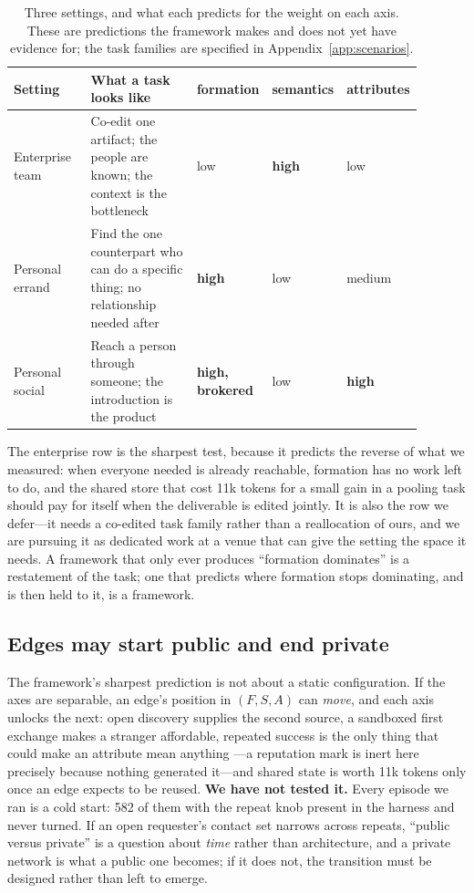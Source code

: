 \ifcompact\else
\begin{table}[t]
\centering\small
\caption{Three settings, and what each predicts for the weight on each axis. These are
predictions the framework makes and does not yet have evidence for; the task families
are specified in Appendix~\ref{app:scenarios}.}
\label{tab:scenarios}
\begin{tabular}{@{}p{0.20\linewidth}p{0.30\linewidth}p{0.13\linewidth}p{0.13\linewidth}p{0.13\linewidth}@{}}
\toprule
\textbf{Setting} & \textbf{What a task looks like} & \textbf{formation} & \textbf{semantics} & \textbf{attributes} \\
\midrule
Enterprise team & Co-edit one artifact; the people are known; the context is the
  bottleneck & low & \textbf{high} & low \\
\addlinespace[2pt]
Personal errand & Find the one counterpart who can do a specific thing; no
  relationship needed after & \textbf{high} & low & medium \\
\addlinespace[2pt]
Personal social & Reach a person through someone; the introduction is the product &
  \textbf{high, brokered} & low & \textbf{high} \\
\bottomrule
\end{tabular}
\end{table}
\fi


The enterprise row is the sharpest test, because it predicts the reverse of what we
measured: when everyone needed is already reachable, formation has no work left to do, and
the shared store that cost 11k tokens for a small gain in a pooling task should pay for
itself when the deliverable is edited jointly. It is also the row we defer---it needs a
co-edited task family rather than a reallocation of ours, and we are pursuing it as
dedicated work at a venue that can give the setting the space it needs. A framework that only ever produces
``formation dominates'' is a restatement of the task; one that predicts where formation
stops dominating, and is then held to it, is a framework.

\ifcompact
\subsection{Edges may start public and end private}
\label{sec:lifecycle}

The framework's sharpest prediction is not about a static configuration. If the axes are
separable, an edge's position in $(F,S,A)$ can \emph{move}, and each axis unlocks the next:
open discovery supplies the second source, a sandboxed first exchange makes a stranger
affordable, repeated success is the only thing that could make an attribute mean anything
---a reputation mark is inert here precisely because nothing generated it---and shared
state is worth 11k tokens only once an edge expects to be reused. \textbf{We have not
tested it.} Every episode we ran is a cold start: 582 of them with the repeat knob present
in the harness and never turned. If an open requester's contact set narrows across
repeats, ``public versus private'' is a question about \emph{time} rather than
architecture, and a private network is what a public one becomes; if it does not, the
transition must be designed rather than left to emerge.

